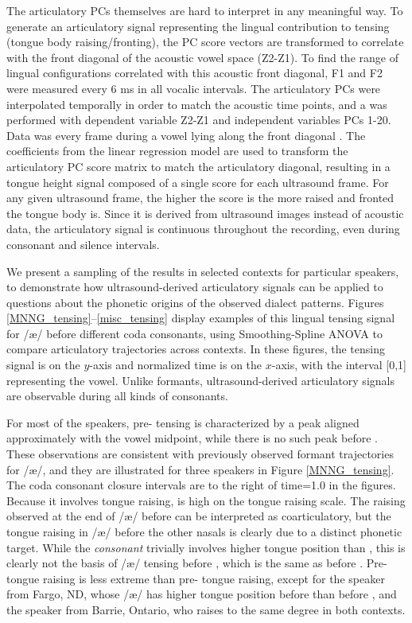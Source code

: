 \documentclass[output=paper]{LSP/langsci}
\begin{document}
The articulatory PCs themselves are hard to interpret in any meaningful way.  To generate an articulatory signal representing the lingual contribution to tensing (tongue body raising/fronting), the PC score vectors are transformed to correlate with the front diagonal of the acoustic vowel space (Z2-Z1). To find the range of lingual configurations correlated with this acoustic front diagonal, F1 and F2 were measured every 6 ms in all vocalic intervals.  The articulatory PCs were interpolated temporally in order to match the acoustic time points, and a  was performed with dependent variable Z2-Z1 and independent variables PCs 1-20. Data was every frame during a vowel lying along the front diagonal . The coefficients from the linear regression model are used to transform the articulatory PC score matrix to match the articulatory diagonal, resulting in a tongue height signal composed of a single score for each ultrasound frame. For any given ultrasound frame, the higher the score is the more raised and fronted the tongue body is.  Since it is derived from ultrasound images instead of acoustic data, the articulatory signal is continuous throughout the recording, even during consonant and silence intervals.

We present a sampling of the results in selected contexts for particular speakers, to demonstrate how ultrasound-derived articulatory signals can be applied to questions about the phonetic origins of the observed dialect patterns.  Figures \ref{MNNG_tensing}--\ref{misc_tensing} display examples of this lingual tensing signal for /æ/ before different coda consonants, using Smoothing-Spline ANOVA \citep{gu_smoothing_2002} to compare articulatory trajectories across contexts. In these figures, the tensing signal is on the $y$-axis and normalized time is on the $x$-axis, with the interval [0,1] representing the vowel.  Unlike formants, ultrasound-derived articulatory signals are observable during all kinds of consonants.

For most of the speakers, pre- tensing is characterized by a peak aligned approximately with the vowel midpoint, while there is no such peak before .  These observations are consistent with previously observed formant trajectories for /æ/, and they are illustrated for three speakers in Figure \ref{MNNG_tensing}.  The coda consonant closure intervals are to the right of time=1.0 in the figures. Because it involves tongue raising,  is high on the tongue raising scale. The raising observed at the end of /æ/ before  can be interpreted as coarticulatory, but the tongue raising in /æ/ before the other nasals is clearly due to a distinct phonetic target.  While the \textit{consonant}  trivially involves higher tongue position than , this is clearly not the basis of /æ/ tensing before , which is the same as before . Pre- tongue raising is less extreme than pre- tongue raising, except for the speaker from Fargo, ND, whose /æ/ has higher tongue position before  than before , and the speaker from Barrie, Ontario, who raises to the same degree in both contexts.
\end{document}
